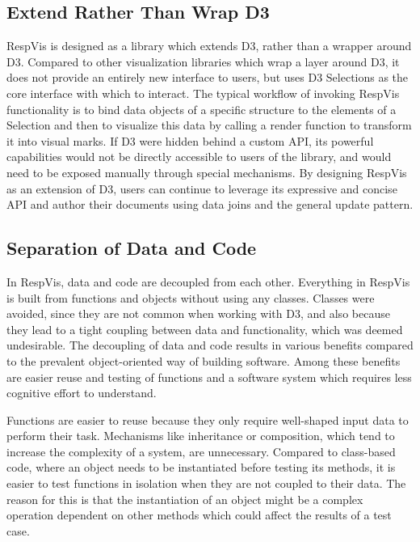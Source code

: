 \subsection{Extend Rather Than Wrap D3}

RespVis is designed as a library which extends D3, rather than a
wrapper around D3. Compared to other visualization libraries which
wrap a layer around D3, it does not provide an entirely new interface
to users, but uses D3 Selections as the core interface with which to
interact. The typical workflow of invoking RespVis functionality is to
bind data objects of a specific structure to the elements of a
Selection and then to visualize this data by calling a render function
to transform it into visual marks. If D3 were hidden behind a custom
API, its powerful capabilities would not be directly accessible to
users of the library, and would need to be exposed manually through
special mechanisms. By designing RespVis as an extension of D3, users
can continue to leverage its expressive and concise API and author
their documents using data joins and the general update pattern.



\subsection{Separation of Data and Code}

In RespVis, data and code are decoupled from each other. Everything in
RespVis is built from functions and objects without using any classes.
Classes were avoided, since they are not common when working with D3,
and also because they lead to a tight coupling between data and
functionality, which was deemed undesirable. The decoupling of data
and code results in various benefits compared to the prevalent
object-oriented way of building software. Among these benefits are
easier reuse and testing of functions and a software system which
requires less cognitive effort to understand.

Functions are easier to reuse because they only require well-shaped
input data to perform their task. Mechanisms like inheritance or
composition, which tend to increase the complexity of a system, are
unnecessary. Compared to class-based code, where an object needs to be
instantiated before testing its methods, it is easier to test
functions in isolation when they are not coupled to their data. The
reason for this is that the instantiation of an object might be a
complex operation dependent on other methods which could affect the
results of a test case.

